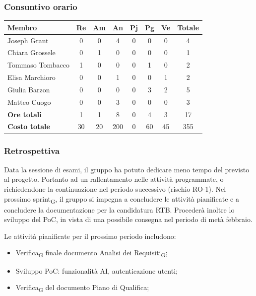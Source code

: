 \documentclass[11pt,a4paper]{article}
\newcommand{\gls}[1]{#1\textsubscript{G}}
\begin{document}
\subsubsection{Consuntivo orario}
\begin{center}
    \begin{tabular}{|l|c|c|c|c|c|c|c|}
        \hline
        \textbf{Membro} & \textbf{Re} & \textbf{Am} & \textbf{An} & \textbf{Pj} & \textbf{Pg} & \textbf{Ve} & \textbf{Totale} \\
        \hline
        Joseph Grant & 0 & 0 & 4 & 0 & 0 & 0 & 4 \\
        \hline
        Chiara Grossele & 0 & 1 & 0 & 0 & 0 & 0 & 1 \\
        \hline
        Tommaso Tombacco & 1 & 0 & 0 & 0 & 1 & 0 & 2 \\
        \hline
        Elisa Marchioro & 0 & 0 & 1 & 0 & 0 & 1 & 2 \\
        \hline
        Giulia Barzon & 0 & 0 & 0 & 0 & 3 & 2 & 5 \\
        \hline
        Matteo Cuogo & 0 & 0 & 3 & 0 & 0 & 0 & 3 \\
        \hline
        \textbf{Ore totali} & 1 & 1 & 8 & 0 & 4 & 3 & 17 \\
        \hline
        \textbf{Costo totale} & 30 & 20 & 200 & 0 & 60 & 45 & 355 \\
        \hline
    \end{tabular}
\end{center}

\subsubsection{Retrospettiva}
Data la sessione di esami, il gruppo ha potuto dedicare meno tempo del previsto al progetto. Portanto ad un rallentamento nelle attività programmate, o richiedendone la continuazione nel periodo successivo (rischio RO-1). 
Nel prossimo \gls{sprint}, il gruppo si impegna a concludere le attività pianificate e a concludere la documentazione per la candidatura RTB. Procederà inoltre lo sviluppo del PoC, in vista di una possibile consegna nel periodo di metà febbraio.

Le attività pianificate per il prossimo periodo includono:
\begin{itemize}
    \item \gls{Verifica} finale documento \gls{Analisi dei Requisiti};
    \item Sviluppo PoC: funzionalità AI, autenticazione utenti;
    \item \gls{Verifica} del documento Piano di Qualifica;
\end{itemize}
\end{document}
